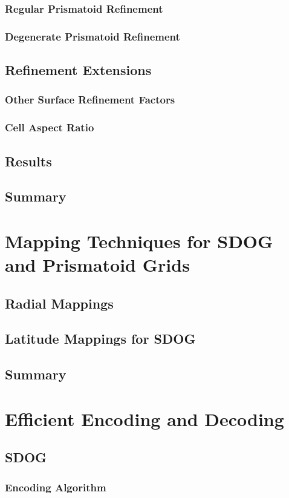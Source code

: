 \documentclass[12pt]{ucalgthes1}
\begin{document}
\subsection{Regular Prismatoid Refinement}
\subsection{Degenerate Prismatoid Refinement}
\section{Refinement Extensions}
\subsection{Other Surface Refinement Factors}
\subsection{Cell Aspect Ratio}
\section{Results}
\section{Summary}

\chapter{Mapping Techniques for SDOG and Prismatoid Grids}
\section{Radial Mappings}
\section{Latitude Mappings for SDOG}
\section{Summary}

\chapter{Efficient Encoding and Decoding}
\section{SDOG}
\subsection{Encoding Algorithm}
\end{document}
